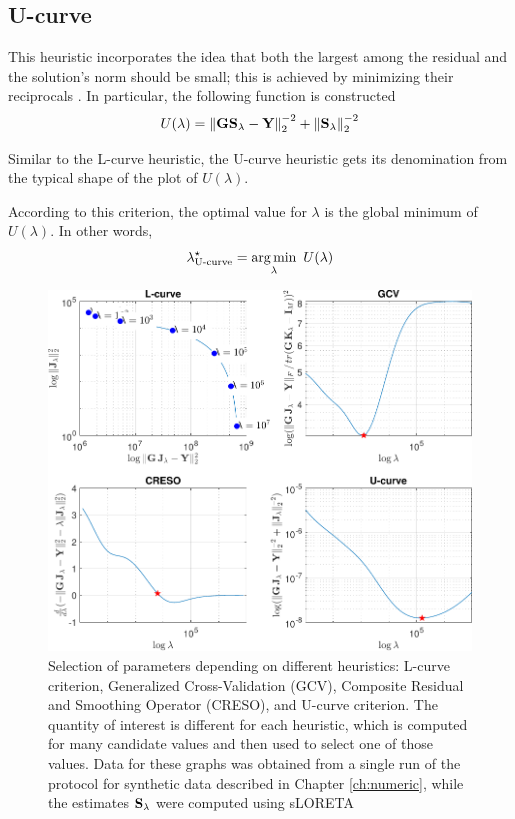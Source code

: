 \subsection{U-curve}

This heuristic incorporates the idea that both the largest among the residual and the solution's norm should be small; this is achieved by minimizing their reciprocals \cite{Ucurve}.
%
In particular, the following function is constructed
\begin{equation}
U(\lambda) = 
\left\lVert \mathbf{G}\mathbf{S}_\lambda - \mathbf{Y} \right\rVert_2^{-2} + \left\lVert \mathbf{S}_\lambda \right\rVert_2^{-2}
\end{equation}

Similar to the L-curve heuristic, the U-curve heuristic gets its denomination from the typical shape of the plot of $U(\lambda)$.

According to this criterion, the optimal value for $\lambda$ is the global minimum of $U(\lambda)$.
%
In other words,
\begin{equation}
    \lambda^\star_\text{U-curve} = 
    \operatorname*{arg\,min}_\lambda\,\, U(\lambda)
\end{equation}

\begin{figure}
\centering
\includegraphics[width=1\linewidth]{./img_MATLAB/ParTuning_sLORETA}
\caption{Selection of parameters depending on different heuristics: L-curve criterion, Generalized Cross-Validation (GCV), Composite Residual and Smoothing Operator (CRESO), and U-curve criterion. The quantity of interest is different for each heuristic, which is computed for many candidate values and then used to select one of those values.
%
Data for these graphs was obtained from a single run of the protocol for synthetic data described in Chapter \ref{ch:numeric}, while the estimates $\mathbf{S}_\lambda$ were computed using sLORETA
}
\label{fig:tuning}
\end{figure}

